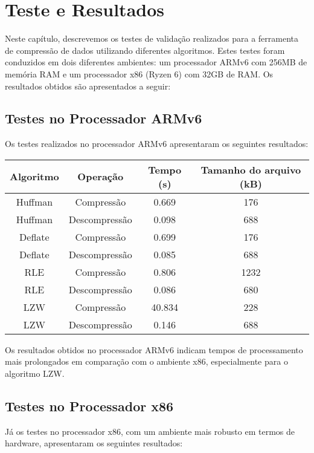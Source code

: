 \chapter{Teste e Resultados}
\label{cap:teste-resultados}

Neste capítulo, descrevemos os testes de validação realizados para a ferramenta de compressão de dados utilizando diferentes algoritmos. Estes testes foram conduzidos em dois diferentes ambientes: um processador ARMv6 com 256MB de memória RAM e um processador x86 (Ryzen 6) com 32GB de RAM. Os resultados obtidos são apresentados a seguir:

\section{Testes no Processador ARMv6}

Os testes realizados no processador ARMv6 apresentaram os seguintes resultados:

\begin{center}
\begin{tabular}{|c|c|c|c|}
\hline
Algoritmo & Operação & Tempo (s) & Tamanho do arquivo (kB) \\
\hline
Huffman & Compressão & 0.669 & 176 \\
Huffman & Descompressão & 0.098 & 688 \\
Deflate & Compressão & 0.699 & 176 \\
Deflate & Descompressão & 0.085 & 688 \\
RLE & Compressão & 0.806 & 1232 \\
RLE & Descompressão & 0.086 & 680 \\
LZW & Compressão & 40.834 & 228 \\
LZW & Descompressão & 0.146 & 688 \\
\hline
\end{tabular}
\end{center}

Os resultados obtidos no processador ARMv6 indicam tempos de processamento mais prolongados em comparação com o ambiente x86, especialmente para o algoritmo LZW.

\section{Testes no Processador x86}

Já os testes no processador x86, com um ambiente mais robusto em termos de hardware, apresentaram os seguintes resultados:

